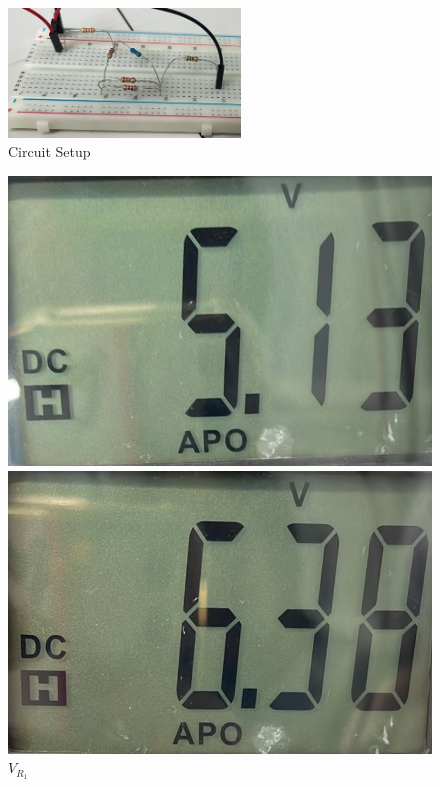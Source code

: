 \begin{figure}[h]
    \centering
    \includegraphics[width=0.55\textwidth]{assets/exp1_circ.jpeg}
    \caption{Circuit Setup}
    \label{fig:exp1_circ}
\end{figure}

\begin{figure}[h]
    \centering
    \begin{minipage}{.25\textwidth}
        \includegraphics[width=0.9\linewidth]{assets/exp_r1.jpeg}
        \caption{$V_{R_1}$}
        \label{fig:exp_r1}
    \end{minipage}%
    \begin{minipage}{.25\textwidth}
        \includegraphics[width=0.9\linewidth]{assets/exp_r2.jpeg}

\end{minipage}
\end{figure}
